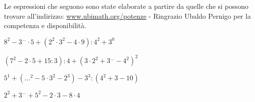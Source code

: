 \subsubsection*{}


Le espressioni che seguono sono state elaborate a partire da quelle che si 
possono trovare all'indirizzo:
\href{http://www.ubimath.org/potenze}{www.ubimath.org/potenze} - 
Ringrazio Ubaldo Pernigo per la competenza e disponibilità.

\begin{esercizio} %
\(8^2-3^{\dots}\cdot5+(2^2\cdot3^2-4\cdot9):4^2+3^0\) 
\end{esercizio}
\begin{esercizio} %
\((7^2-2\cdot5+15:3):4+(3\cdot2^2+3^{\dots}-4^2)^2\) 
\end{esercizio}
\begin{esercizio} %
\(5^1+({\dots}^2-5\cdot3^2-2^3)-3^3:(4^2+3-10)\) 
\end{esercizio}
\begin{esercizio} %
\(2^2+3^{\dots}+5^2-2\cdot3-8\cdot4\) 
\end{esercizio}
